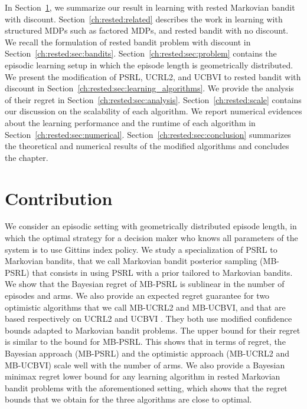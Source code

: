 In Section~\ref{ch:rested:sec:contribute}, we summarize our result in learning with rested Markovian bandit with discount.
Section~\ref{ch:rested:related} describes the work in learning with structured MDPs such as factored MDPs, and rested bandit with no discount.
We recall the formulation of rested bandit problem with discount in Section~\ref{ch:rested:sec:bandits}.
Section~\ref{ch:rested:sec:problem} contains the episodic learning setup in which the episode length is geometrically distributed.
We present the modification of PSRL, UCRL2, and UCBVI to rested bandit with discount in Section~\ref{ch:rested:sec:learning_algorithms}.
We provide the analysis of their regret in Section~\ref{ch:rested:sec:analysis}.
Section~\ref{ch:rested:scale} contains our discussion on the scalability of each algorithm.
We report numerical evidences about the learning performance and the runtime of each algorithm in Section~\ref{ch:rested:sec:numerical}.
Section~\ref{ch:rested:sec:conclusion} summarizes the theoretical and numerical results of the modified algorithms and concludes the chapter.

\section{Contribution}
\label{ch:rested:sec:contribute}

We consider an episodic setting with geometrically distributed episode length, in which the optimal strategy for a decision maker who knows all parameters of the system is to use Gittins index policy. We study a specialization of PSRL \cite{osband2013more} to Markovian bandits, that we call Markovian bandit posterior sampling (MB-PSRL) that consists in using PSRL with a prior tailored to Markovian bandits. We show that the Bayesian regret of MB-PSRL is sublinear in the number of episodes and arms. We also provide an expected regret guarantee for two optimistic algorithms that we call MB-UCRL2 and MB-UCBVI, and that are based respectively on UCRL2 \cite{jaksch2010near} and UCBVI \cite{azar2017minimax}. They both use modified  confidence bounds adapted to Markovian bandit problems. The upper bound for their regret is similar to the bound for MB-PSRL. This shows that in terms of regret, the Bayesian approach (MB-PSRL) and the optimistic approach (MB-UCRL2 and MB-UCBVI) scale well with the number of arms. We also provide a Bayesian minimax regret lower bound for any learning algorithm in rested Markovian bandit problems with the aforementioned setting, which shows that the regret bounds that we obtain for the three algorithms are close to optimal.

